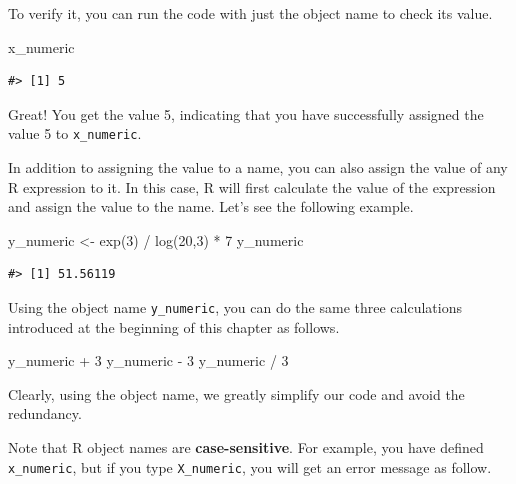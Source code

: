 \documentclass[
]{book}
\newenvironment{Shaded}{\begin{snugshade}}{\end{snugshade}}
\newcommand{\DecValTok}[1]{\textcolor[rgb]{0.00,0.00,0.81}{#1}}
\newcommand{\FunctionTok}[1]{\textcolor[rgb]{0.00,0.00,0.00}{#1}}
\newcommand{\NormalTok}[1]{#1}
\newcommand{\OtherTok}[1]{\textcolor[rgb]{0.56,0.35,0.01}{#1}}
\newcommand{\SpecialCharTok}[1]{\textcolor[rgb]{0.00,0.00,0.00}{#1}}
\begin{document}
To verify it, you can run the code with just the object name to check its value.

\begin{Shaded}
\begin{Highlighting}[]
\NormalTok{x\_numeric}
\end{Highlighting}
\end{Shaded}

\begin{verbatim}
#> [1] 5
\end{verbatim}

Great! You get the value 5, indicating that you have successfully assigned the value 5 to \texttt{x\_numeric}.

In addition to assigning the value to a name, you can also assign the value of any R expression to it. In this case, R will first calculate the value of the expression and assign the value to the name. Let's see the following example.

\begin{Shaded}
\begin{Highlighting}[]
\NormalTok{y\_numeric }\OtherTok{\textless{}{-}} \FunctionTok{exp}\NormalTok{(}\DecValTok{3}\NormalTok{) }\SpecialCharTok{/} \FunctionTok{log}\NormalTok{(}\DecValTok{20}\NormalTok{,}\DecValTok{3}\NormalTok{) }\SpecialCharTok{*} \DecValTok{7}
\NormalTok{y\_numeric}
\end{Highlighting}
\end{Shaded}

\begin{verbatim}
#> [1] 51.56119
\end{verbatim}

Using the object name \texttt{y\_numeric}, you can do the same three calculations introduced at the beginning of this chapter as follows.

\begin{Shaded}
\begin{Highlighting}[]
\NormalTok{y\_numeric }\SpecialCharTok{+} \DecValTok{3}
\NormalTok{y\_numeric }\SpecialCharTok{{-}} \DecValTok{3}
\NormalTok{y\_numeric }\SpecialCharTok{/} \DecValTok{3}
\end{Highlighting}
\end{Shaded}

Clearly, using the object name, we greatly simplify our code and avoid the redundancy.

Note that R object names are \textbf{case-sensitive}. For example, you have defined \texttt{x\_numeric}, but if you type \texttt{X\_numeric}, you will get an error message as follow.
\end{document}
